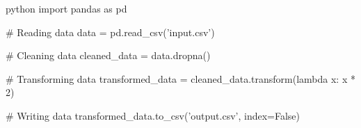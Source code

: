 python
import pandas as pd

# Reading data
data = pd.read_csv('input.csv')

# Cleaning data
cleaned_data = data.dropna()

# Transforming data
transformed_data = cleaned_data.transform(lambda x: x * 2)

# Writing data
transformed_data.to_csv('output.csv', index=False)